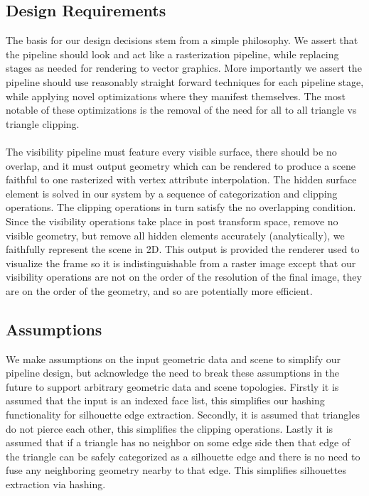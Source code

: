 \documentclass[review]{acmsiggraph}
\begin{document}
\subsection{Design Requirements}
The basis for our design decisions stem from a simple philosophy. We assert that the pipeline should look and act like a rasterization pipeline, while replacing stages as needed for rendering to vector graphics. More importantly we assert the pipeline should use reasonably straight forward techniques for each pipeline stage, while applying novel optimizations where they manifest themselves. The most notable of these optimizations is the removal of the need for all to all triangle vs triangle clipping.
\\\\
The visibility pipeline must feature every visible surface, there should be no overlap, and it must output geometry which can be rendered to produce a scene faithful to one rasterized with vertex attribute interpolation. The hidden surface element is solved in our system by a sequence of categorization and clipping operations. The clipping operations in turn satisfy the no overlapping condition. Since the visibility operations take place in post transform space, remove no visible geometry, but remove all hidden elements accurately (analytically), we faithfully represent the scene in 2D. This output is provided the renderer used to visualize the frame so it is indistinguishable from a raster image except that our visibility operations are not on the order of the resolution of the final image, they are on the order of the geometry, and so are potentially more efficient.

\subsection{Assumptions}
We make assumptions on the input geometric data and scene to simplify our pipeline design, but acknowledge the need to break these assumptions in the future to support arbitrary geometric data and scene topologies. Firstly it is assumed that the input is an indexed face list, this simplifies our hashing functionality for silhouette edge extraction. Secondly, it is assumed that triangles do not pierce each other, this simplifies the clipping operations. Lastly it is assumed that if a triangle has no neighbor on some edge side then that edge of the triangle can be safely categorized as a silhouette edge and there is no need to fuse any neighboring geometry nearby to that edge. This simplifies silhouettes extraction via hashing.
\end{document}
